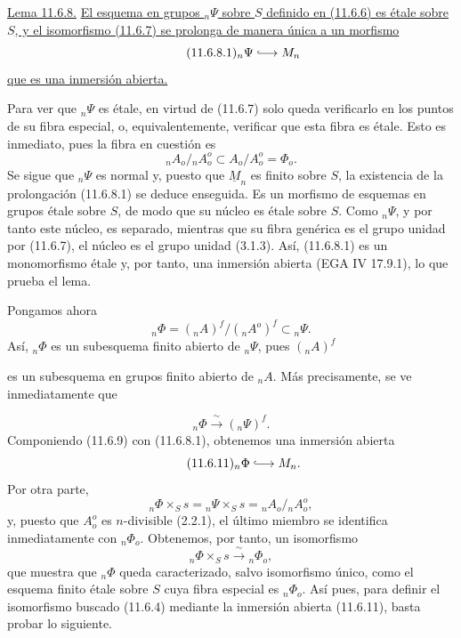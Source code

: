 \medskip
\noindent
\underline{Lema 11.6.8.} \underline{El esquema en grupos ${}_n\Psi$
sobre $S$ definido en (11.6.6) es étale sobre $S$, y el isomorfismo
(11.6.7) se prolonga de manera única a un morfismo}
\begin{equation}\tag{11.6.8.1}
{}_n\Psi\lhook\joinrel\longrightarrow\underline M_n
\end{equation}
\underline{que es una inmersión abierta.}

Para ver que ${}_n\Psi$ es étale, en virtud de (11.6.7) solo queda
verificarlo en los puntos de su fibra especial, o, equivalentemente,
verificar que esta fibra es étale. Esto es inmediato, pues la fibra en
cuestión es
\begin{equation*}
{}_nA_o/{}_nA_o^o\subset A_o/A_o^o=\Phi_o.
\end{equation*}
Se sigue que ${}_n\Psi$ es normal y, puesto que $\underline M_n$ es
finito sobre $S$, la existencia de la prolongación (11.6.8.1) se deduce
enseguida. Es un morfismo de esquemas en grupos étale sobre $S$, de modo
que su núcleo es étale sobre $S$. Como ${}_n\Psi$, y por tanto este
núcleo, es separado, mientras que su fibra genérica es el grupo unidad
por (11.6.7), el núcleo es el grupo unidad (3.1.3). Así, (11.6.8.1) es
un monomorfismo étale y, por tanto, una inmersión abierta (EGA IV
17.9.1), lo que prueba el lema.

Pongamos ahora
\begin{equation}\tag{11.6.9}
{}_n\Phi=({}_nA)^f/({}_nA^o)^f\subset{}_n\Psi.
\end{equation}
Así, ${}_n\Phi$ es un subesquema finito abierto de ${}_n\Psi$, pues
$({}_nA)^f$


es un subesquema en grupos finito abierto de ${}_nA$. Más precisamente,
se ve inmediatamente que

\begin{equation}\tag{11.6.10}
{}_n\Phi\xrightarrow{\ \sim\ }({}_n\Psi)^f.
\end{equation}
Componiendo (11.6.9) con (11.6.8.1), obtenemos una inmersión abierta
\begin{equation}\tag{11.6.11}
{}_n\Phi\lhook\joinrel\longrightarrow\underline M_n.
\end{equation}
Por otra parte,
\begin{equation*}
{}_n\Phi\times_Ss={}_n\Psi\times_Ss={}_nA_o/{}_nA_o^o,
\end{equation*}
y, puesto que $A_o^o$ es $n$-divisible (2.2.1), el último miembro se
identifica inmediatamente con ${}_n\Phi_o$. Obtenemos, por tanto, un
isomorfismo
\begin{equation}\tag{11.6.12}
{}_n\Phi\times_Ss\xrightarrow{\ \sim\ }{}_n\Phi_o,
\end{equation}
que muestra que ${}_n\Phi$ queda caracterizado, salvo isomorfismo único,
como el esquema finito étale sobre $S$ cuya fibra especial es
${}_n\Phi_o$. Así pues, para definir el isomorfismo buscado (11.6.4)
mediante la inmersión abierta (11.6.11), basta probar lo siguiente.

